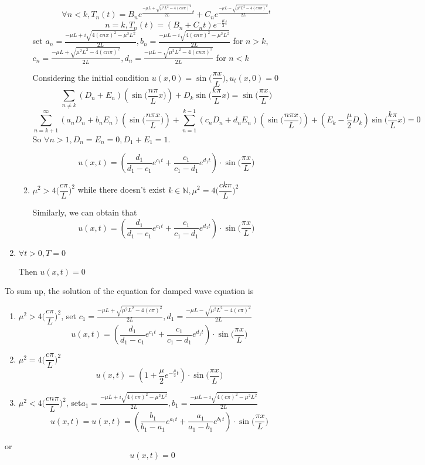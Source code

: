 \documentclass[a4paper,12pt,titlepage]{article}
\begin{document}
\begin{enumerate}
\begin{enumerate}
$$\forall n< k, T_n(t)=B_ne^{\frac{-\mu L+\sqrt{\mu^2L^2-4(cn\pi)^2}}{2L}t}+C_ne^{\frac{-\mu L-\sqrt{\mu^2L^2-4(cn\pi)^2}}{2L}t}$$
$$ n= k, T_n(t)=(B_n+C_nt)e^{-\frac{\mu}{2}t}$$
set $a_n=\frac{-\mu L+i\sqrt{4(cn\pi)^2-\mu^2L^2}}{2L},b_n=\frac{-\mu L-i\sqrt{4(cn\pi)^2-\mu^2L^2}}{2L}$ for $n>k$,\\ $c_n=\frac{-\mu L+\sqrt{\mu^2L^2-4(cn\pi)^2}}{2L},d_n=\frac{-\mu L-\sqrt{\mu^2L^2-4(cn\pi)^2}}{2L}$ for $n<k$

Considering the initial condition $u(x,0)=\sin\Big(\dfrac{\pi x}{L}\Big),u_t(x,0)=0$
$$\sum\limits_{n\neq k}(D_n+E_n)(\sin\Big(\dfrac{n\pi}{L}x\Big))+D_k\sin\Big(\dfrac{k\pi}{L}x\Big)=\sin\Big(\dfrac{\pi x}{L}\Big)$$
$$\sum\limits_{n=k+1}^{\infty}(a_nD_n+b_nE_n)(\sin\Big(\dfrac{n\pi x}{L}\Big))+\sum\limits_{n=1}^{k-1}(c_nD_n+d_nE_n)(\sin\Big(\dfrac{n\pi x}{L}\Big))+(E_k-\dfrac{\mu}{2}D_k)\sin\Big(\dfrac{k\pi}{L}x\Big)=0$$
So $\forall n>1,D_n=E_n=0,D_1+E_1=1$. 


$$u(x,t)=(\dfrac{d_1}{d_1-c_1}e^{c_1t}+\dfrac{c_1}{c_1-d_1}e^{d_1t})\cdot \sin\Big(\dfrac{\pi x}{L}\Big)$$


\item $\mu^2>4\Big(\dfrac{c\pi}{L}\Big)^2$ while there doesn't exist $k\in\mathbb{N},\mu^2=4\Big(\dfrac{ck\pi}{L}\Big)^2 $

Similarly, we can obtain that 
$$u(x,t)=(\dfrac{d_1}{d_1-c_1}e^{c_1t}+\dfrac{c_1}{c_1-d_1}e^{d_1t})\cdot \sin\Big(\dfrac{\pi x}{L}\Big)$$


\end{enumerate}
\item $\forall t>0,T=0$

Then $u(x,t)=0$
\end{enumerate}

To sum up, the solution of the equation for damped wave equation is
\begin{enumerate}
\item $\mu^2>4\Big(\dfrac{c\pi}{L}\Big)^2$, set $c_1=\frac{-\mu L+\sqrt{\mu^2L^2-4(c\pi)^2}}{2L},d_1=\frac{-\mu L-\sqrt{\mu^2L^2-4(c\pi)^2}}{2L}$ 
$$u(x,t)=(\dfrac{d_1}{d_1-c_1}e^{c_1t}+\dfrac{c_1}{c_1-d_1}e^{d_1t})\cdot \sin\Big(\dfrac{\pi x}{L}\Big)$$
\item $\mu^2=4\Big(\dfrac{c\pi}{L}\Big)^2$
$$u(x,t)=(1+\dfrac{\mu}{2}e^{-\frac{\mu}{2}t})\cdot \sin\Big(\dfrac{\pi x}{L}\Big)$$
\item $\mu^2<4\Big(\dfrac{cn\pi}{L}\Big)^2$, set$a_1=\frac{-\mu L+i\sqrt{4(c\pi)^2-\mu^2L^2}}{2L},b_1=\frac{-\mu L-i\sqrt{4(c\pi)^2-\mu^2L^2}}{2L}$
$$u(x,t)=u(x,t)=(\dfrac{b_1}{b_1-a_1}e^{a_1t}+\dfrac{a_1}{a_1-b_1}e^{b_1t})\cdot \sin\Big(\dfrac{\pi x}{L}\Big)$$
\end{enumerate}
or
$$u(x,t)=0$$
\end{document}

